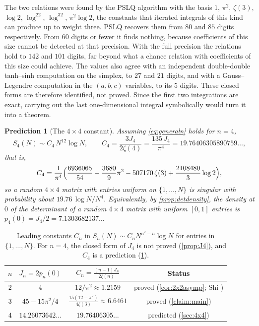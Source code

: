 \documentclass[11pt]{article}
\newtheorem{prediction}[theorem]{Prediction}
\theoremstyle{definition}
\begin{document}
The two relations were found by the PSLQ algorithm \cite{PSLQ} with the basis $1$, $\pi^2$, $\zeta(3)$, $\log2$, $\log^22$, $\log^32$, $\pi^2\log2$, the constants that iterated integrals of this kind can produce up to weight three. PSLQ recovers them from $80$ and $85$ digits respectively. From $60$ digits or fewer it finds nothing, because coefficients of this size cannot be detected at that precision. With the full precision the relations hold to $142$ and $101$ digits, far beyond what a chance relation with coefficients of this size could achieve. The values also agree with an independent double-double tanh--sinh computation on the simplex, to $27$ and $21$ digits, and with a Gauss--Legendre computation in the $(a,b,c)$ variables, to its $5$ digits. These closed forms are therefore identified, not proved. Since the first two integrations are exact, carrying out the last one-dimensional integral symbolically would turn it into a theorem.

\begin{prediction}[The $4\times4$ constant]\label{claim:4x4}
Assuming \eqref{eq:generaln} holds for $n=4$,
\[
S_4(N)\sim C_4\,N^{12}\log N,\qquad C_4=\frac{3J_4}{2\zeta(4)}=\frac{135\,J_4}{\pi^4}=19.76406305890759\ldots,
\]
that is,
\[
C_4=\frac{1}{\pi^4}\Bigl(\frac{6936065}{54}-\frac{3680}{9}\pi^2-507170\,\zeta(3)+\frac{2108480}{3}\log2\Bigr),
\]
so a random $4\times4$ matrix with entries uniform on $\{1,\dots,N\}$ is singular with probability about $19.76\,\log N/N^4$. Equivalently, by \cref{prop:detdensity}, the density at $0$ of the determinant of a random $4\times4$ matrix with uniform $[0,1]$ entries is $p_4(0)=J_4/2=7.1303682137\ldots$
\end{prediction}

\begin{table}[htbp]
\centering
\begin{tabular}{@{}cccc@{}}
\toprule
$n$ & $J_n=2p_n(0)$ & $C_n=\frac{(n-1)J_n}{2\zeta(n)}$ & Status \\
\midrule
$2$ & $4$ & $12/\pi^2\approx1.2159$ & proved (\cref{cor:2x2asymp}; Shi \cite{Shi}) \\
$3$ & $45-15\pi^2/4$ & $\frac{15(12-\pi^2)}{4\zeta(3)}\approx6.6461$ & proved (\cref{claim:main}) \\
$4$ & $14.26073642\ldots$ & $19.76406305\ldots$ & predicted (\cref{sec:4x4}) \\
\bottomrule
\end{tabular}
\caption{Leading constants $C_n$ in $S_n(N)\sim C_nN^{n^2-n}\log N$ for entries in $\{1,\dots,N\}$. For $n=4$, the closed form of $J_4$ is not proved (\cref{prop:J4}), and $C_4$ is a prediction (\cref{claim:4x4}).}
\label{tab:Cn}
\end{table}
\end{document}
